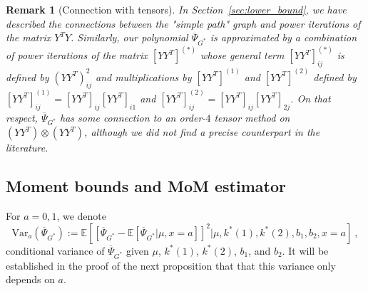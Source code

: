 \documentclass{article}
\newtheorem{remark}{Remark}
\begin{document}
    \begin{remark}[Connection with tensors] In Section~\ref{sec:lower_bound}, we have described the connections between the "simple path" graph and power iterations of the matrix $Y^T Y$.
    Similarly, our polynomial $\overline{\Psi}_{G^*}$ is approximated by a combination of power iterations of the matrix $[Y Y^T]^{(*)}$ whose general term   $[Y Y^T]^{(*)}_{ij}$ is defined by $(Y Y^T)_{ij}^2$ and multiplications by  $[Y Y^T]^{(1)}$ and  $[Y Y^T]^{(2)}$ defined by  $[Y Y^T]^{(1)}_{ij}= [Y Y^T]_{ij}[Y Y^T]_{i1}$ and $[Y Y^T]^{(2)}_{ij}= [Y Y^T]_{ij}[Y Y^T]_{2j}$. On that respect, $\overline{\Psi}_{G^*}$ has some connection to an  order-$4$ tensor method on $(Y Y^T)\otimes (YY^T)$, although we did not find a precise counterpart in the literature. 
    \end{remark}






\subsection{Moment bounds and MoM estimator}

For $a=0,1$, we denote
\[
\mathrm{Var}_a(\overline{\Psi}_{G^*}):= \mathbb{E}\left[\left[\overline{\Psi}_{G^*} - \mathbb E[\overline{\Psi}_{G^*}|\mu,x=a]\right]^2 \Big|\mu, k^*(1),k^*(2),b_1,b_2,x=a\right]\ , 
\]
conditional variance of $\overline{\Psi}_{G^*}$ given $\mu$, $k^*(1)$, $k^*(2)$, $b_1$, and $b_2$. It will be established in the proof of the next proposition that that this variance only depends on $a$. 
\end{document}
